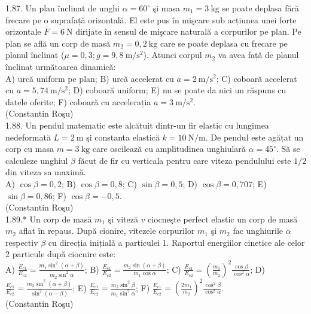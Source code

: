 1.87. Un plan înclinat de unghi $\alpha=60^{\circ}$ şi masa $m_{1}=3 \mathrm{~kg}$ se poate deplasa fără frecare pe o suprafață orizontală. El este pus în mişcare sub acțiunea unei forțe orizontale $F=6 \mathrm{~N}$ dirijate în sensul de mişcare naturală a corpurilor pe plan. Pe plan se află un corp de masă $m_{2}=0,2 \mathrm{~kg}$ care se poate deplasa cu frecare pe planul înclinat ($\mu=0,3 ; g=9,8 \mathrm{~m} / \mathrm{s}^{2}$). Atunci corpul $m_{2}$ va avea față de planul înclinat următoarea dinamică:\\ A) urcă uniform pe plan; B) urcă accelerat cu $a=2 \mathrm{~m} / \mathrm{s}^{2}$; C) coboară accelerat cu $a=5,74 \mathrm{~m} / \mathrm{s}^{2}$; D) coboară uniform; E) nu se poate da nici un răspuns cu datele oferite; F) coboară cu accelerația $a=3 \mathrm{~m} / \mathrm{s}^{2}$.\\ (Constantin Roşu)\\

1.88. Un pendul matematic este alcătuit dintr-un fir elastic cu lungimea nedeformată $L=2 \mathrm{~m}$ şi constanta elastică $k=10 \mathrm{~N} / \mathrm{m}$. De pendul este agățat un corp cu masa $m=3 \mathrm{~kg}$ care oscilează cu amplitudinea unghiulară $\alpha=45^{\circ}$. Să se calculeze unghiul $\beta$ făcut de fir cu verticala pentru care viteza pendulului este $1 / 2$ din viteza sa maximă.\\ A) $\cos \beta=0,2$; B) $\cos \beta=0,8$; C) $\sin \beta=0,5$; D) $\cos \beta=0,707$; E) $\sin \beta=0,86$; F) $\cos \beta=-0,5$.\\ (Constantin Roşu)\\

1.89.* Un corp de masă $m_{1}$ şi viteză $v$ ciocneşte perfect elastic un corp de masă $m_{2}$ aflat în repaus. După cionire, vitezele corpurilor $m_{1}$ şi $m_{2}$ fac unghiurile $\alpha$ respectiv $\beta$ cu direcția inițialǎ a particulei 1. Raportul energiilor cinetice ale celor 2 particule după ciocnire este:\\ A) $\frac{E_{c 1}}{E_{c 2}}=\frac{m_{1} \sin ^{2}(\alpha+\beta)}{m_{2} \sin ^{2} \alpha}$; B) $\frac{E_{c 1}}{E_{c 2}}=\frac{m_{2} \sin (\alpha+\beta)}{m_{1} \cos \alpha}$; C) $\frac{E_{c 1}}{E_{c 2}}=\left(\frac{m_{1}}{m_{2}}\right)^{2} \frac{\cos \beta}{\cos ^{2} \alpha}$; D) $\frac{E_{c 1}}{E_{c 2}}=\frac{m_{2} \sin ^{2}(\alpha+\beta)}{\sin ^{2}(\alpha-\beta)}$; E) $\frac{E_{c 1}}{E_{c 2}}=\frac{m_{2} \sin ^{2} \beta}{m_{1} \sin ^{2} \alpha}$; F) $\frac{E_{c 1}}{E_{c 2}}=\left(\frac{2 m_{1}}{m_{2}}\right)^{2} \frac{\cos ^{2} \beta}{\cos ^{2} \alpha}$.\\ (Constantin Roşu)\\

